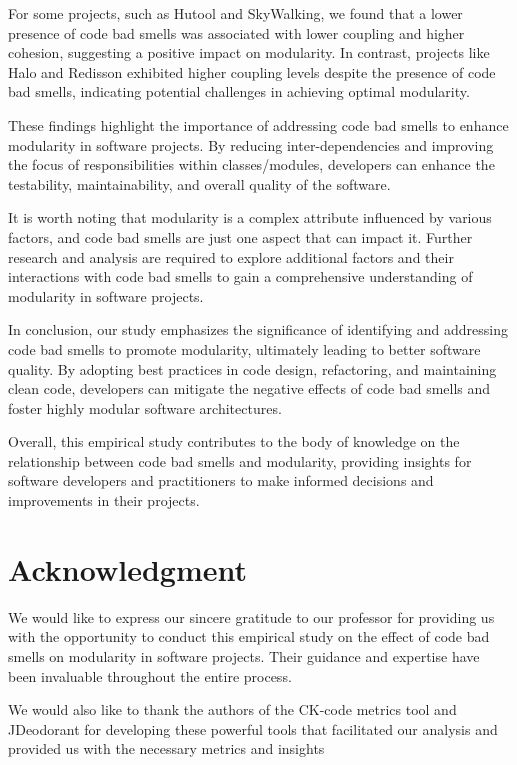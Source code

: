 \documentclass[conference]{IEEEtran}
\begin{document}
	For some projects, such as Hutool and SkyWalking, we found that a lower presence of code bad smells was associated with lower coupling and higher cohesion, suggesting a positive impact on modularity. In contrast, projects like Halo and Redisson exhibited higher coupling levels despite the presence of code bad smells, indicating potential challenges in achieving optimal modularity.
	
	These findings highlight the importance of addressing code bad smells to enhance modularity in software projects. By reducing inter-dependencies and improving the focus of responsibilities within classes/modules, developers can enhance the testability, maintainability, and overall quality of the software.
	
	It is worth noting that modularity is a complex attribute influenced by various factors, and code bad smells are just one aspect that can impact it. Further research and analysis are required to explore additional factors and their interactions with code bad smells to gain a comprehensive understanding of modularity in software projects.
	
	In conclusion, our study emphasizes the significance of identifying and addressing code bad smells to promote modularity, ultimately leading to better software quality. By adopting best practices in code design, refactoring, and maintaining clean code, developers can mitigate the negative effects of code bad smells and foster highly modular software architectures.
	
	Overall, this empirical study contributes to the body of knowledge on the relationship between code bad smells and modularity, providing insights for software developers and practitioners to make informed decisions and improvements in their projects.
	\section*{Acknowledgment}
	We would like to express our sincere gratitude to our professor for providing us with the opportunity to conduct this empirical study on the effect of code bad smells on modularity in software projects. Their guidance and expertise have been invaluable throughout the entire process.
	
	We would also like to thank the authors of the CK-code metrics tool and JDeodorant for developing these powerful tools that facilitated our analysis and provided us with the necessary metrics and insights
	
\end{document}
